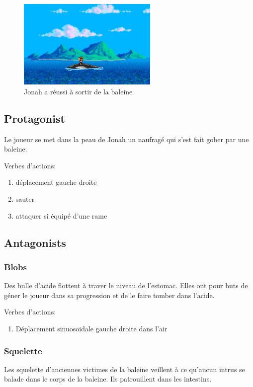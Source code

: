 \documentclass{prologArticle}
\begin{document}
\begin{figure}[H]
    \centering
    \includegraphics[width=0.6\textwidth]{res/story3.png}
    \caption{Jonah a réussi à sortir de la baleine}
\end{figure}

\subsection{Protagonist}

Le joueur se met dans la peau de Jonah un naufragé qui s'est fait gober par une baleine.

Verbes d'actions:
\begin{enumerate}
    \item déplacement gauche droite
    \item sauter
    \item attaquer si équipé d'une rame
\end{enumerate}

\subsection{Antagonists}

\subsubsection{Blobs}
Des bulle d'acide flottent à traver le niveau de l'estomac. Elles ont pour buts de géner le joueur dans sa progression et de le faire tomber dans l'acide.

Verbes d'actions:
\begin{enumerate}
    \item Déplacement sinuosoidale gauche droite dans l'air
\end{enumerate}

\subsubsection{Squelette}
Les squelette d'anciennes victimes de la baleine veillent à ce qu'aucun intrus se balade dans le corps de la baleine. Ils patrouillent dans les intestins.
\end{document}
